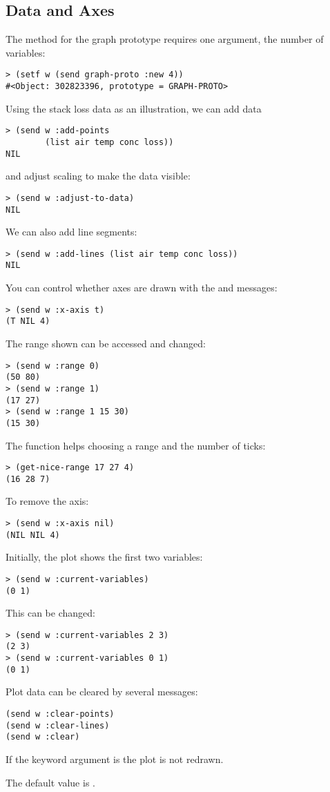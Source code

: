 \begin{slide}{}
\subsection{Data and Axes}
The  method for the graph prototype
requires one argument, the number of variables:
{\Large
\begin{verbatim}
> (setf w (send graph-proto :new 4))
#<Object: 302823396, prototype = GRAPH-PROTO>
\end{verbatim}}
Using the stack loss data as an illustration, we can add data
{\Large
\begin{verbatim}
> (send w :add-points
        (list air temp conc loss))
NIL
\end{verbatim}}
and adjust scaling to make the data visible:
{\Large
\begin{verbatim}
> (send w :adjust-to-data)
NIL
\end{verbatim}}
We can also add line segments:
{\Large
\begin{verbatim}
> (send w :add-lines (list air temp conc loss))
NIL
\end{verbatim}}
\end{slide}

\begin{slide}{}
You can control whether axes are drawn with the  and
 messages:
{\Large
\begin{verbatim}
> (send w :x-axis t)
(T NIL 4)
\end{verbatim}}

The range shown can be accessed and changed:
{\Large
\begin{verbatim}
> (send w :range 0)
(50 80)
> (send w :range 1)
(17 27)
> (send w :range 1 15 30)
(15 30)
\end{verbatim}}
The function  helps choosing a range and
the number of ticks:
{\Large
\begin{verbatim}
> (get-nice-range 17 27 4)
(16 28 7)
\end{verbatim}}
To remove the axis:
{\Large
\begin{verbatim}
> (send w :x-axis nil)
(NIL NIL 4)
\end{verbatim}}
\end{slide}

\begin{slide}{}
Initially, the plot shows the first two variables:
\begin{verbatim}
> (send w :current-variables)
(0 1)
\end{verbatim}
This can be changed:
\begin{verbatim}
> (send w :current-variables 2 3)
(2 3)
> (send w :current-variables 0 1)
(0 1)
\end{verbatim}
Plot data can be cleared by several messages:
\begin{verbatim}
(send w :clear-points)
(send w :clear-lines)
(send w :clear)
\end{verbatim}
If the  keyword argument is  the plot
is not redrawn.

The default value is .
\end{slide}

